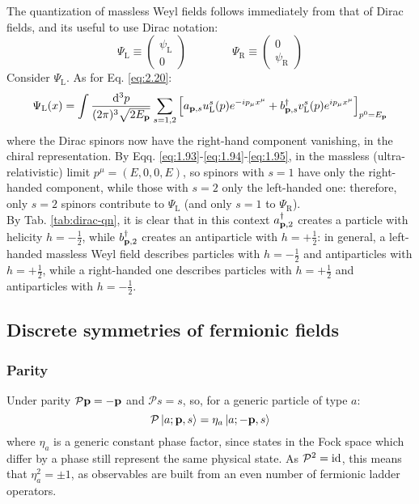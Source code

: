 The quantization of massless Weyl fields follows immediately from that of Dirac fields, and its useful to use Dirac notation:
\begin{equation*}
  \Psi_\text{L} \equiv
  \begin{pmatrix}
    \psi_\text{L} \\ 0
  \end{pmatrix}
  \qquad \qquad
  \Psi_\text{R} \equiv
  \begin{pmatrix}
    0 \\ \psi_\text{R}
  \end{pmatrix}
\end{equation*}
Consider $ \Psi_\text{L} $. As for Eq. \ref{eq:2.20}:
\begin{equation*}
  \Psi_\text{L}(x) = \int \frac{\mathrm{d}^3p}{(2\pi)^3 \sqrt{2E_{\mathbf{p}}}} \sum_{s = 1,2} \left[ a_{\mathbf{p},s} u_\text{L}^s(p) e^{-i p_\mu x^\mu} + b_{\mathbf{p},s}^\dagger v_\text{L}^s(p) e^{i p_\mu x^\mu} \right]_{p^0 = E_{\mathbf{p}}}
\end{equation*}
where the Dirac spinors now have the right-hand component vanishing, in the chiral representation. By Eqq. \ref{eq:1.93}-\ref{eq:1.94}-\ref{eq:1.95}, in the massless (ultra-relativistic) limit $ p^\mu = (E,0,0,E) $, so spinors with $ s = 1 $ have only the right-handed component, while those with $ s = 2 $ only the left-handed one: therefore, only $ s = 2 $ spinors contribute to $ \Psi_\text{L} $ (and only $ s = 1 $ to $ \Psi_\text{R} $).\\
By Tab. \ref{tab:dirac-qn}, it is clear that in this context $ a_{\mathbf{p},2}^\dagger $ creates a particle with helicity $ h = - \frac{1}{2} $, while $ b_{\mathbf{p},2}^\dagger $ creates an antiparticle with $ h = + \frac{1}{2} $: in general, a left-handed massless Weyl field describes particles with $ h = - \frac{1}{2} $ and antiparticles with $ h = + \frac{1}{2} $, while a right-handed one describes particles with $ h = + \frac{1}{2} $ and antiparticles with $ h = - \frac{1}{2} $.

\subsection{Discrete symmetries of fermionic fields}

\subsubsection{Parity}

Under parity $ \mathcal{P} \mathbf{p} = - \mathbf{p} $ and $ \mathcal{P} s = s $, so, for a generic particle of type $ a $:
\begin{equation}
  \mathcal{P} \ket{a; \mathbf{p},s} = \eta_a \ket{a; -\mathbf{p},s}
  \label{eq:2.28}
\end{equation}
where $ \eta_a $ is a generic constant phase factor, since states in the Fock space which differ by a phase still represent the same physical state. As $ \mathcal{P}^2 = \operatorname{id} $, this means that $ \eta_a^2 = \pm 1 $, as observables are built from an even number of fermionic ladder operators.

